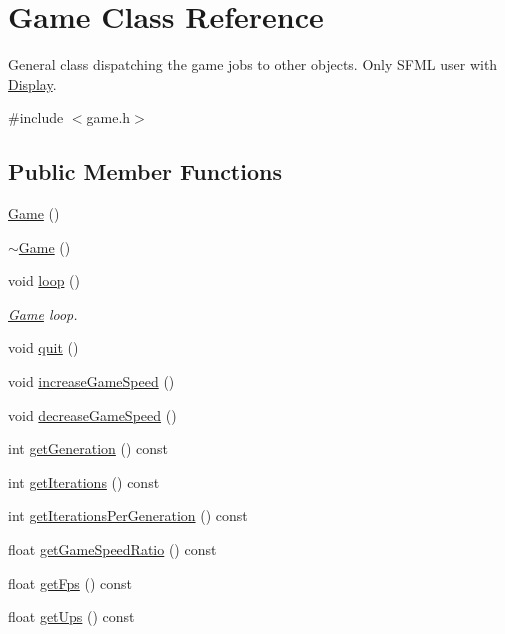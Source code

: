 \hypertarget{class_game}{\section{Game Class Reference}
\label{class_game}
}


General class dispatching the game jobs to other objects. Only S\-F\-M\-L user with \hyperlink{class_display}{Display}.  




{\ttfamily \#include $<$game.\-h$>$}

\subsection*{Public Member Functions}
\begin{DoxyCompactItemize}
\item 
\hyperlink{class_game_ad59df6562a58a614fda24622d3715b65}{Game} ()
\item 
\hyperlink{class_game_ae3d112ca6e0e55150d2fdbc704474530}{$\sim$\-Game} ()
\item 
void \hyperlink{class_game_a7ad92b77b596d7882a7ae76eb18b5e6c}{loop} ()
\begin{DoxyCompactList}\small\item\em \hyperlink{class_game}{Game} loop. \end{DoxyCompactList}\item 
void \hyperlink{class_game_a8272be134d16c277bb014ad6a22fc357}{quit} ()
\item 
void \hyperlink{class_game_a7c89563d299f25881c8c8a42c1e3219e}{increase\-Game\-Speed} ()
\item 
void \hyperlink{class_game_adcf5df2f7a3f5209f974741667b1236f}{decrease\-Game\-Speed} ()
\item 
int \hyperlink{class_game_a3949b192e3277375cd07c98d3360bc44}{get\-Generation} () const 
\item 
int \hyperlink{class_game_adc07928f26c664cefc2c6abee7846d5e}{get\-Iterations} () const 
\item 
int \hyperlink{class_game_abcda9001eb350576bae25bc51b567422}{get\-Iterations\-Per\-Generation} () const 
\item 
float \hyperlink{class_game_a16dc509013f9a07a905656830bfa674d}{get\-Game\-Speed\-Ratio} () const 
\item 
float \hyperlink{class_game_a90335116dc7ad193f6476a0c2a502662}{get\-Fps} () const 
\item 
float \hyperlink{class_game_aa555c6e4a6d743384a99c55d75a37bd2}{get\-Ups} () const 
\end{DoxyCompactItemize}


